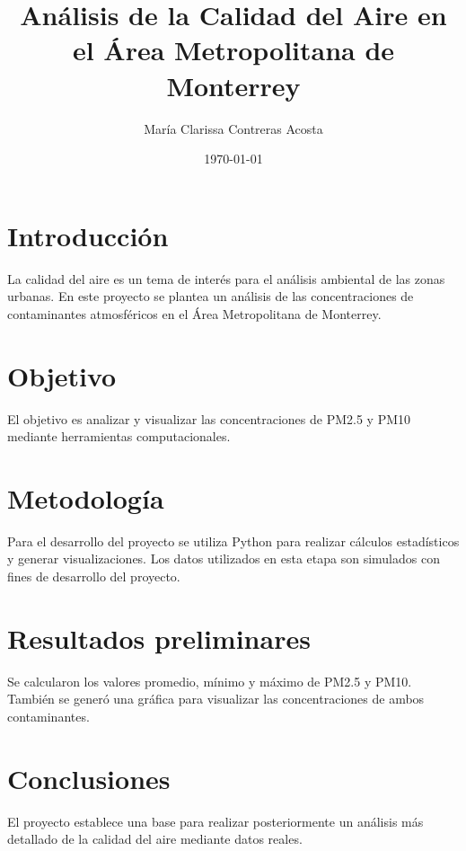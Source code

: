 \documentclass{article}
\title{Análisis de la Calidad del Aire en el Área Metropolitana de Monterrey}
\author{María Clarissa Contreras Acosta}
\date{\today}
\begin{document}
\maketitle

\section{Introducción}

La calidad del aire es un tema de interés para el análisis
ambiental de las zonas urbanas. En este proyecto se plantea
un análisis de las concentraciones de contaminantes atmosféricos
en el Área Metropolitana de Monterrey.

\section{Objetivo}

El objetivo es analizar y visualizar las concentraciones de
PM2.5 y PM10 mediante herramientas computacionales.

\section{Metodología}

Para el desarrollo del proyecto se utiliza Python para realizar
cálculos estadísticos y generar visualizaciones. Los datos
utilizados en esta etapa son simulados con fines de desarrollo
del proyecto.

\section{Resultados preliminares}

Se calcularon los valores promedio, mínimo y máximo de PM2.5
y PM10. También se generó una gráfica para visualizar las
concentraciones de ambos contaminantes.

\section{Conclusiones}

El proyecto establece una base para realizar posteriormente
un análisis más detallado de la calidad del aire mediante
datos reales.
\end{document}
